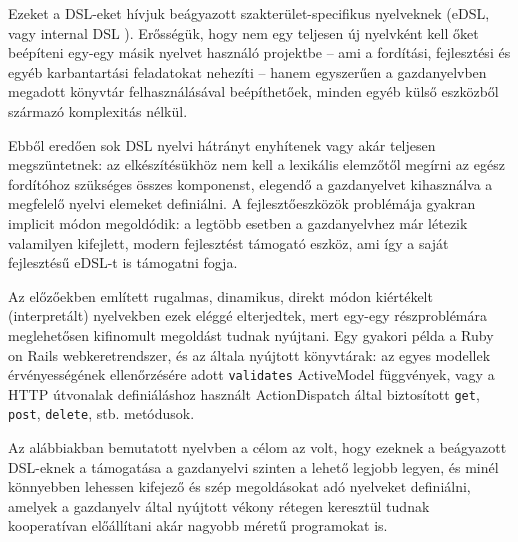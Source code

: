 Ezeket a \gls{DSL}-eket hívjuk beágyazott szakterület-specifikus nyelveknek (\gls{eDSL}, vagy internal \gls{DSL} \cite{fowlerBlikiInternalDsl2006}).
Erősségük, hogy nem egy teljesen új nyelvként kell őket beépíteni egy-egy másik nyelvet használó projektbe -- ami a fordítási, fejlesztési és egyéb karbantartási feladatokat nehezíti -- hanem egyszerűen a gazdanyelvben megadott könyvtár felhasználásával beépíthetőek, minden egyéb külső eszközből származó komplexitás nélkül.

Ebből eredően sok \gls{DSL} nyelvi hátrányt enyhítenek vagy akár teljesen megszüntetnek: az elkészítésükhöz nem kell a lexikális elemzőtől megírni az egész fordítóhoz szükséges összes komponenst, elegendő a gazdanyelvet kihasználva a megfelelő nyelvi elemeket definiálni.
A fejlesztőeszközök problémája gyakran implicit módon megoldódik: a legtöbb esetben a gazdanyelvhez már létezik valamilyen kifejlett, modern fejlesztést támogató eszköz, ami így a saját fejlesztésű \gls{eDSL}-t is támogatni fogja.

Az előzőekben említett rugalmas, dinamikus, direkt módon kiértékelt (interpretált) nyelvekben ezek eléggé elterjedtek, mert egy-egy részproblémára meglehetősen kifinomult megoldást tudnak nyújtani.
Egy gyakori példa a Ruby on Rails webkeretrendszer, és az általa nyújtott könyvtárak: az egyes modellek érvényességének ellenőrzésére adott {\tt validates} ActiveModel függvények, vagy a HTTP útvonalak definiáláshoz használt ActionDispatch által biztosított {\tt get}, {\tt post}, {\tt delete}, stb. metódusok.

Az alábbiakban bemutatott nyelvben a célom az volt, hogy ezeknek a beágyazott \gls{DSL}-eknek a támogatása a gazdanyelvi szinten a lehető legjobb legyen, és minél könnyebben lehessen kifejező és szép megoldásokat adó nyelveket definiálni, amelyek a gazdanyelv által nyújtott vékony rétegen keresztül tudnak kooperatívan előállítani akár nagyobb méretű programokat is.







